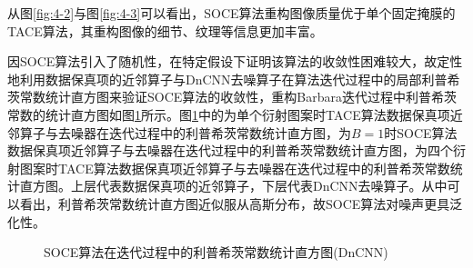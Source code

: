 从图\ref{fig:4-2}与图\ref{fig:4-3}可以看出，SOCE算法重构图像质量优于单个固定掩膜的TACE算法，其重构图像的细节、纹理等信息更加丰富。

因SOCE算法引入了随机性，在特定假设下证明该算法的收敛性困难较大，故定性地利用数据保真项的近邻算子与DnCNN去噪算子在算法迭代过程中的局部利普希茨常数统计直方图来验证SOCE算法的收敛性，重构Barbara迭代过程中利普希茨常数的统计直方图如图\ref{fig:4-4}所示。图\ref{fig:4-4}中的为单个衍射图案时TACE算法数据保真项近邻算子与去噪器在迭代过程中的利普希茨常数统计直方图，为$B=1$时SOCE算法数据保真项近邻算子与去噪器在迭代过程中的利普希茨常数统计直方图，为四个衍射图案时TACE算法数据保真项近邻算子与去噪器在迭代过程中的利普希茨常数统计直方图。上层代表数据保真项的近邻算子，下层代表DnCNN去噪算子。从中可以看出，利普希茨常数统计直方图近似服从高斯分布，故SOCE算法对噪声更具泛化性。
\begin{figure}[!htbp]
	\centering
	\subfigure[fix 1]{
		\label{subfigure:4-1-1}
		\begin{minipage}[t]{0.2\linewidth}
			\centering
			\texttt{[image: 4-4-1]}\\
			\texttt{[image: 4-4-2]}
		\end{minipage}
	}
	\subfigure[B=1]{
		\label{subfigure:4-1-2}
		\begin{minipage}[t]{0.2\linewidth}
			\centering
			\texttt{[image: 4-4-3]}\\
			\texttt{[image: 4-4-4]}
		\end{minipage}
	}
	\subfigure[fix 4]{
		\label{subfigure:4-1-3}
		\begin{minipage}[t]{0.2\linewidth}
			\centering
			\texttt{[image: 4-4-5]}\\
			\texttt{[image: 4-4-6]}
		\end{minipage}
	}
	\caption{SOCE算法在迭代过程中的利普希茨常数统计直方图(DnCNN)} 
	\label{fig:4-4}
\end{figure}

